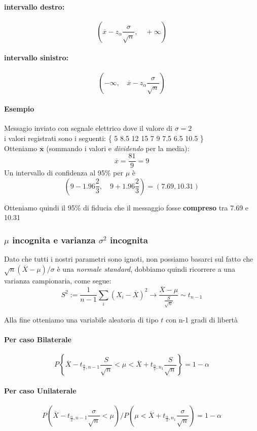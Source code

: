 \documentclass[]{article}
\begin{document}
    \paragraph{intervallo destro:}
    $$ (\overline{x} - z_\alpha \frac{\sigma}{\sqrt{n}},\quad  +\infty) $$
    \paragraph{intervallo sinistro:}
    $$ (-\infty,\quad \overline{x} - z_\alpha \frac{\sigma}{\sqrt{n}}) $$
    \paragraph{Esempio} Messagio inviato con segnale elettrico dove il valore di $\sigma = 2$ \\
    i valori registrati sono i seguenti: \{ 5 8.5 12 15 7 9 7.5 6.5 10.5 \} \\
    Otteniamo $\boldsymbol{\overline{x}}$ (sommando i valori e \textit{dividendo} per la media):
    \[ \overline{x} = \frac{81}{9} = 9 \]
    Un intervallo di confidenza al 95\% per $\mu$ è
    \[ \left( 9 - 1.96 \frac{2}{3}, \quad 9 + 1.96 \frac{2}{3}\right) = (7.69, 10.31) \]
    \centerline{Otteniamo quindi il 95\% di fiducia che il messaggio fosse \textbf{compreso} tra 7.69 e 10.31}
    \subsubsection{$\mu$ incognita e varianza  $\sigma^2$ incognita}
    Dato che tutti i nostri parametri sono ignoti, non possiamo basarci sul fatto che $\sqrt{n}(\overline{X} - \mu) / \sigma$ è una \textit{normale standard}, dobbiamo quindi ricorrere a una varianza campionaria, come segue:
    \[ S^2 := \frac{1}{n-1} \sum_{i}^{} (X_i - \overline{X})^2 \longrightarrow \frac{\overline{X} - \mu}{\frac{S}{\sqrt{n}}} \sim t_{n-1}\]
    \centerline{Alla fine otteniamo una variabile aleatoria di tipo $t$ con n-1 gradi di libertà}
    \paragraph{Per caso Bilaterale}
    \[ P \left\{ \overline{X} - t_{\frac{\alpha}{2}, n-1} \frac{S}{\sqrt{n}} < \mu < \overline{X} + t_{\frac{\alpha}{2}, n_1} \frac{S}{\sqrt{n}} \right\} = 1 - \alpha \]
    \paragraph{Per caso Unilaterale}
    \[ P \left( \overline{X} - t_{\frac{\alpha}{2}, n-1} \frac{\sigma}{\sqrt{n}} < \mu \right) /  P \left( \mu < \overline{X} + t_{\frac{\alpha}{2}, n_1} \frac{\sigma}{\sqrt{n}}\right) = 1 - \alpha \]
\end{document}
